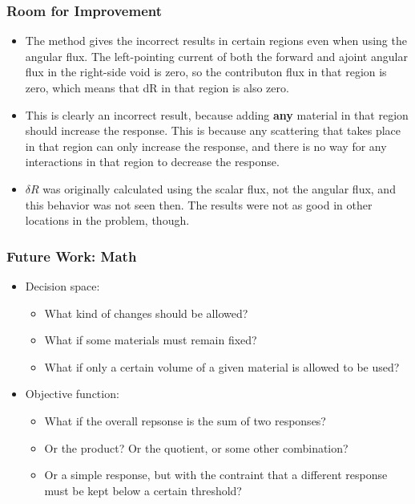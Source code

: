 \documentclass[t]{beamer}
\begin{document}
\begin{frame}
  \frametitle{Room for Improvement}
  \begin{itemize}
  \item The method gives the incorrect results in certain regions even when
        using the angular flux. The left-pointing current of both the forward
        and ajoint angular flux in the right-side void is zero, so the
        contributon flux in that region is zero, which means that dR in that
        region is also zero.
  \item This is clearly an incorrect result, because adding \textbf{any}
        material in that region should increase the response. This is because
        any scattering that takes place in that region can only increase the
        response, and there is no way for any interactions in that region to
        decrease the response.
  \item $\delta R$ was originally calculated using the scalar flux, not the
        angular flux, and this behavior was not seen then. The results were not
        as good in other locations in the problem, though.
  \end{itemize}
\end{frame}


\begin{frame}
  \frametitle{Future Work: Math}
  \begin{itemize}
    \item Decision space:
    \begin{itemize}
      \item What kind of changes should be allowed?
      \item What if some materials must remain fixed?
      \item What if only a certain volume of a given material is allowed to be
            used?
    \end{itemize}
    \item Objective function:
    \begin{itemize}
      \item What if the overall repsonse is the sum of two responses?
      \item Or the product? Or the quotient, or some other combination?
      \item Or a simple response, but with the contraint that a different
            response must be kept below a certain threshold?
    \end{itemize}
  \end{itemize}
\end{frame}
\end{document}
